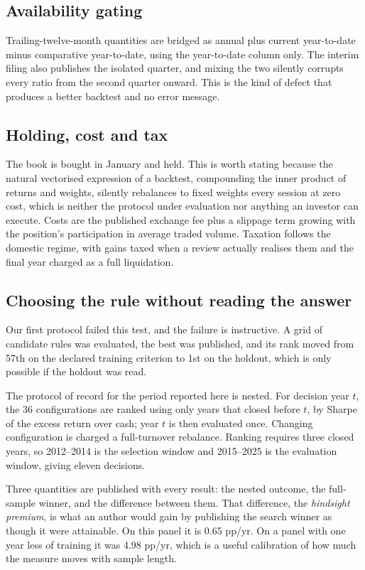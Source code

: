 \documentclass[10pt,conference]{IEEEtran}
\begin{document}
\subsection{Availability gating}

Trailing-twelve-month quantities are bridged as annual plus current year-to-date minus comparative year-to-date, using the year-to-date column only. The interim filing also publishes the isolated quarter, and mixing the two silently corrupts every ratio from the second quarter onward. This is the kind of defect that produces a better backtest and no error message.

\subsection{Holding, cost and tax}

The book is bought in January and held. This is worth stating because the natural vectorised expression of a backtest, compounding the inner product of returns and weights, silently rebalances to fixed weights every session at zero cost, which is neither the protocol under evaluation nor anything an investor can execute. Costs are the published exchange fee plus a slippage term growing with the position's participation in average traded volume. Taxation follows the domestic regime, with gains taxed when a review actually realises them and the final year charged as a full liquidation.

\subsection{Choosing the rule without reading the answer}

Our first protocol failed this test, and the failure is instructive. A grid of candidate rules was evaluated, the best was published, and its rank moved from 57th on the declared training criterion to 1st on the holdout, which is only possible if the holdout was read.

The protocol of record for the period reported here is nested. For decision year $t$, the 36 configurations are ranked using only years that closed before $t$, by Sharpe of the excess return over cash; year $t$ is then evaluated once. Changing configuration is charged a full-turnover rebalance. Ranking requires three closed years, so 2012--2014 is the selection window and 2015--2025 is the evaluation window, giving eleven decisions.

Three quantities are published with every result: the nested outcome, the full-sample winner, and the difference between them. That difference, the \emph{hindsight premium}, is what an author would gain by publishing the search winner as though it were attainable. On this panel it is 0.65 pp/yr. On a panel with one year less of training it was 4.98 pp/yr, which is a useful calibration of how much the measure moves with sample length.
\end{document}
